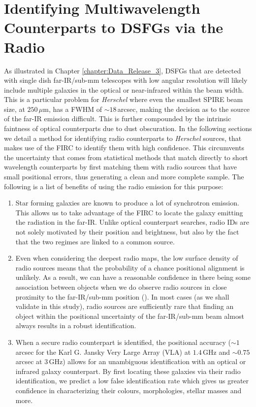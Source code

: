 \section{Identifying Multiwavelength Counterparts to DSFGs via the Radio}

As illustrated in Chapter \ref{chapter:Data_Release_3}, DSFGs that are detected with single dish far-IR/sub-mm telescopes with low angular resolution will likely include multiple galaxies in the optical or near-infrared within the beam width. This is a particular problem for \textit{Herschel} where even the smallest SPIRE beam size, at $250\,\mu$m, has a FWHM of $\sim 18\,$arcsec, making the decision as to the source of the far-IR emission difficult. This is further compounded by the intrinsic faintness of optical counterparts due to dust obscuration. In the following sections we detail a method for identifying radio counterparts to \textit{Herschel} sources, that makes use of the FIRC to identify them with high confidence. This circumvents the uncertainty that comes from statistical methods that match directly to short wavelength counterparts by first matching them with radio sources that have small positional errors, thus generating a clean and more complete sample. The following is a list of benefits of using the radio emission for this purpose:

\begin{enumerate}
    \item Star forming galaxies are known to produce a lot of synchrotron emission. This allows us to take advantage of the FIRC to locate the galaxy emitting the radiation in the far-IR. Unlike optical counterpart searches, radio IDs are not solely motivated by their position and brightness, but also by the fact that the two regimes are linked to a common source.
    \item Even when considering the deepest radio maps, the low surface density of radio sources means that the probability of a chance positional alignment is unlikely. As a result, we can have a reasonable confidence in there being some association between objects when we do observe radio sources in close proximity to the far-IR/sub-mm position (\citealt{Ivison_2002, Borys_2004}). In most cases (as we shall validate in this study), radio sources are sufficiently rare that finding an object within the positional uncertainty of the far-IR/sub-mm beam almost always results in a robust identification.
    \item When a secure radio counterpart is identified, the positional accuracy ($\sim 1\,$arcsec for the Karl G. Jansky Very Large Array (VLA) at $1.4\,$GHz and $\sim 0.75\,$arcsec at $3\,$GHz) allows for an unambiguous identification with an optical or infrared galaxy counterpart. By first locating these galaxies via their radio identification, we predict a low false identification rate which gives us greater confidence in characterizing their colours, morphologies, stellar masses and more.
\end{enumerate}

